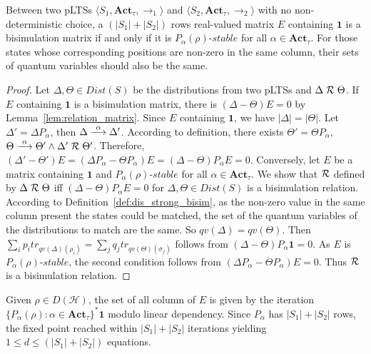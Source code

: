 \documentclass[runningheads]{llncs}
\begin{document}
\begin{proposition}
\label{prop:bisimulation_deterministic_qlts}
Between two pLTSs $\langle S_1,\textbf{Act}_{\tau},\rightarrow_1 \rangle$ and $\langle S_2,\textbf{Act}_{\tau},\rightarrow_2 \rangle$ with no non-deterministic choice, a $(|S_1|+|S_2|)$ rows real-valued matrix $E$ containing $\textbf{1}$ is a bisimulation matrix if and only if it is $P_{\alpha}(\rho)\text{-}stable$ for all $\alpha\in\textbf{Act}_{\tau}$. For those states whose corresponding positions are non-zero in the same column, their sets of quantum variables should also be the same.
\begin{proof}
Let $\Delta,\Theta\in Dist(S)$ be the distributions from two pLTSs and $\Delta\mathrel{{\mathcal R }}\Theta$. If $E$ containing $\textbf{1}$ is a bisimulation matrix, there is $(\Delta-\Theta)E=0$ by Lemma~\ref{lem:relation_matrix}. Since $E$ containing $\textbf{1}$, we have $|\Delta|=|\Theta|$. Let $\Delta'=\Delta P_{\alpha}$, then $\Delta\mathrel{\stackrel{\alpha}{\longrightarrow}}\Delta'$. According to definition, there exists $\Theta'=\Theta P_{\alpha}$, $\Theta\mathrel{\stackrel{\alpha}{\longrightarrow}}\Theta'\wedge\Delta'\mathrel{{\mathcal R }}\Theta'$. Therefore, $(\Delta'-\Theta')E=(\Delta P_{\alpha}-\Theta P_{\alpha})E=(\Delta-\Theta)P_{\alpha}E=0$.
Conversely, let $E$ be a matrix containing $\textbf{1}$ and $P_{\alpha}(\rho)\text{-}stable$ for all $\alpha\in\textbf{Act}_{\tau}$. We show that $\mathrel{{\mathcal R }}$ defined by $\Delta\mathrel{{\mathcal R }}\Theta$ iff $(\Delta-\Theta)P_{\alpha}E=0$ for $\Delta,\Theta\in Dist(S)$ is a bisimulation relation. According to Definition~\ref{def:dis_strong_bisim}, as the non-zero value in the same column present the states could be matched, the set of the quantum variables of the distributions to match are the same. So $qv(\Delta)=qv(\Theta)$. Then $\sum_{i}p_{i}tr_{qv(\Delta)(\rho_{i})}=\sum_{j}q_{j}tr_{qv(\Theta)(\sigma_{j})}$ follows from $(\Delta-\Theta)P_{\alpha}\textbf{1}=0$. As $E$ is $P_{\alpha}(\rho)\text{-}stable$, the second condition follows from $(\Delta P_{\alpha}-\Theta P_{\alpha})E=0$. Thus $\mathrel{{\mathcal R }}$ is a bisimulation relation.
\end{proof}
\end{proposition}

Given $\rho\in D(\mathcal{H})$, the set of all column of $E$ is given by the iteration $\{P_{\alpha}(\rho):\alpha\in\textbf{Act}_{\tau}\}^*\textbf{1}$ modulo linear dependency. Since $P_{\alpha}$ has $|S_1|+|S_2|$ rows, the fixed point reached within $|S_1|+|S_2|$ iterations yielding $1\leq d\leq(|S_1|+|S_2|)$ equations.
\end{document}
